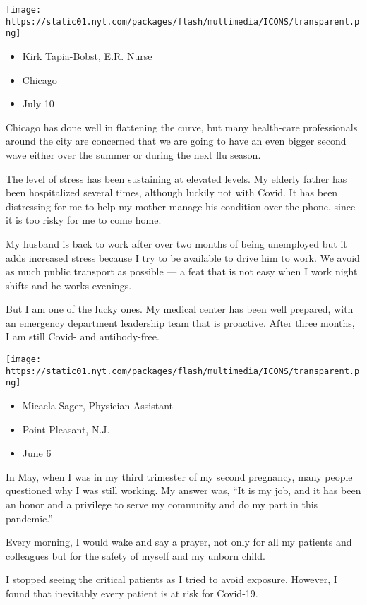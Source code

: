 \texttt{[image: https://static01.nyt.com/packages/flash/multimedia/ICONS/transparent.png]}

\begin{itemize}
\tightlist
\item
  Kirk Tapia-Bobst, E.R. Nurse
\item
  Chicago
\item
  July 10
\end{itemize}

Chicago has done well in flattening the curve, but many health-care
professionals around the city are concerned that we are going to have an
even bigger second wave either over the summer or during the next flu
season.

The level of stress has been sustaining at elevated levels. My elderly
father has been hospitalized several times, although luckily not with
Covid. It has been distressing for me to help my mother manage his
condition over the phone, since it is too risky for me to come home.

My husband is back to work after over two months of being unemployed but
it adds increased stress because I try to be available to drive him to
work. We avoid as much public transport as possible --- a feat that is
not easy when I work night shifts and he works evenings.

But I am one of the lucky ones. My medical center has been well
prepared, with an emergency department leadership team that is
proactive. After three months, I am still Covid- and antibody-free.

\texttt{[image: https://static01.nyt.com/packages/flash/multimedia/ICONS/transparent.png]}

\begin{itemize}
\tightlist
\item
  Micaela Sager, Physician Assistant
\item
  Point Pleasant, N.J.
\item
  June 6
\end{itemize}

In May, when I was in my third trimester of my second pregnancy, many
people questioned why I was still working. My answer was, ``It is my
job, and it has been an honor and a privilege to serve my community and
do my part in this pandemic.''

Every morning, I would wake and say a prayer, not only for all my
patients and colleagues but for the safety of myself and my unborn
child.

I stopped seeing the critical patients as I tried to avoid exposure.
However, I found that inevitably every patient is at risk for Covid-19.

